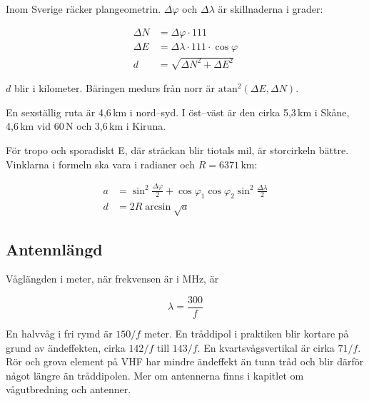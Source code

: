 Inom Sverige räcker plangeometrin. $\Delta\varphi$ och $\Delta\lambda$ är
skillnaderna i grader:

\begin{align}
	\Delta N &= \Delta\varphi \cdot 111 \\
	\Delta E &= \Delta\lambda \cdot 111 \cdot \cos\varphi \\
	d &= \sqrt{\Delta N^2 + \Delta E^2}
\end{align}

$d$ blir i kilometer. Bäringen medurs från norr är
$\operatorname{atan^2}(\Delta E, \Delta N)$.

En sexställig ruta är 4,6\,km i nord--syd. I öst--väst är den cirka
5,3\,km i Skåne, 4,6\,km vid 60\textdegree\,N och 3,6\,km i Kiruna.

För tropo och sporadiskt E, där sträckan blir tiotals mil, är storcirkeln
bättre. Vinklarna i formeln ska vara i radianer och $R = 6371$\,km:

\begin{align}
	a &= \sin^2\frac{\Delta\varphi}{2}
		+ \cos\varphi_1\cos\varphi_2\sin^2\frac{\Delta\lambda}{2} \\
	d &= 2R\arcsin\sqrt{a}
\end{align}

\subsection{Antennlängd}

Våglängden i meter, när frekvensen är i MHz, är

\begin{equation}
	\lambda = \frac{300}{f}
\end{equation}

En halvvåg i fri rymd är $150/f$ meter. En tråddipol i praktiken blir
kortare på grund av ändeffekten, cirka $142/f$ till $143/f$. En
kvartsvågsvertikal är cirka $71/f$. Rör och grova element på VHF har
mindre ändeffekt än tunn tråd och blir därför något längre än
tråddipolen. Mer om antennerna finns i kapitlet om vågutbredning och
antenner.

